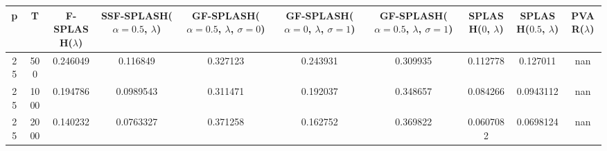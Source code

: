 \begin{tabular}{cccccccccc}
\hline
  p  &  T   &  F-SPLASH($\lambda$)  &  SSF-SPLASH($\alpha=0.5$, $\lambda$)  &  GF-SPLASH($\alpha=0.5$, $\lambda$, $\sigma=0$)  &  GF-SPLASH($\alpha=0$, $\lambda$, $\sigma=1$)  &  GF-SPLASH($\alpha=0.5$, $\lambda$, $\sigma=1$)  &  SPLASH($0$, $\lambda$)  &  SPLASH($0.5$, $\lambda$)  &  PVAR($\lambda$)  \\
\hline
 25  & 500  &       0.246049        &               0.116849                &                     0.327123                     &                    0.243931                    &                     0.309935                     &         0.112778         &          0.127011          &        nan        \\
 25  & 1000 &       0.194786        &               0.0989543               &                     0.311471                     &                    0.192037                    &                     0.348657                     &         0.084266         &         0.0943112          &        nan        \\
 25  & 2000 &       0.140232        &               0.0763327               &                     0.371258                     &                    0.162752                    &                     0.369822                     &        0.0607082         &         0.0698124          &        nan        \\
\hline
\end{tabular}